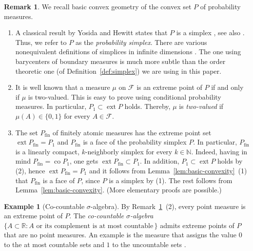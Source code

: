 \documentclass[a4paper,11pt,reqno]{amsart}
\numberwithin{equation}{section}
\theoremstyle{plain}
\theoremstyle{definition}
\newtheorem{remark}[theorem]{Remark}
\newtheorem{example}[theorem]{Example}
\newcommand{\cF}{\mathcal{F}} %
\newcommand{\N}{\mathbb{N}} %
\newcommand{\R}{\mathbb{R}} %
\DeclareMathOperator\conv{co} %
\DeclareMathOperator{\ext}{ext} %
\newcommand\fint{\mathrm{fin}}
\begin{document}
\begin{remark}\label{rem:measures-basics}
We recall basic convex geometry of the convex set $P$ of probability measures.
\begin{enumerate}
\item
A classical result by Yosida and Hewitt states that $P$ is a simplex 
\cite[Theorem~1.14]{yosida-hewitt52}, see also \cite[Section~10.11]{aliprantis-border06}. 
Thus, we refer to $P$ as the \emph{probability simplex}. There are various nonequivalent 
definitions of simplices in infinite dimensions \cite[Section~1.5]{winkler85}. The one 
using barycenters of boundary measures is much more subtle than the order theoretic one 
(of Definition~\ref{def:simplex}) we are using in this paper.
%
\item 
It is well known that a measure $\mu$ on $\cF$ is an extreme point of $P$ if and 
only if $\mu$ is two-valued. This is easy to prove using conditional probability 
measures. In particular, $P_1\subset\ext P$ holds. Thereby, $\mu$ is \emph{two-valued} 
if $\mu(A)\in\{0,1\}$ for every $A\in\cF$. 
%
\item
The set $P\!_\fint$ of finitely atomic measures has the extreme point set $\ext P\!_\fint=P_1$ 
and $P\!_\fint$ is a face of the probability simplex $P$. In particular, $P\!_\fint$ is a 
linearly compact, $k$-neighborly simplex for every $k\in\N$. Indeed, having in mind 
$P\!_\fint=\conv P_1$, one gets $\ext P_\fint\subset P_1$. In addition, $P_1\subset\ext P$ 
holds by (2), hence $\ext P_\fint=P_1$ and it follows from Lemma~\ref{lem:basic-convexity}~(1) 
that $P\!_\fint$ is a face of $P$, since $P$ is a simplex by (1). The rest follows from
Lemma~\ref{lem:basic-convexity}. (More elementary proofs are possible.)
\end{enumerate}
\end{remark}
%
\begin{example}[Co-countable $\sigma$-algebra]\label{rem:co-countable}
By Remark~\ref{rem:measures-basics}~(2), every point measure is an extreme 
point of $P$. The \emph{co-countable $\sigma$-algebra} 
$\{A\subset\R:\text{$A$ or its complement is at most countable}\,\}$
admits extreme points of $P$ that are no point measures. An example is the 
measure that assigns the value $0$ to the at most countable sets and $1$ 
to the uncountable sets \cite[Section~6.9]{schilling-kuehn21}.
\end{example}
%
\end{document}
